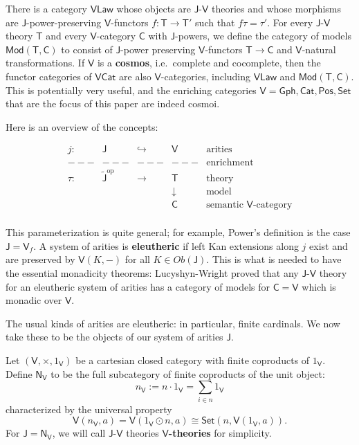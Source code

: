 \documentclass{amsart}
\theoremstyle{definition}
\newcommand{\Gph}{\mathsf{Gph}}
\newcommand{\Set}{\mathsf{Set}}
\newcommand{\Cat}{\mathsf{Cat}}
\newcommand{\Law}{\mathsf{Law}}
\newcommand{\Pos}{\mathsf{Pos}}
\newcommand{\Mod}{\mathsf{Mod}}
\newcommand{\NN}{\mathsf{N}}
\newcommand{\V}{\mathsf{V}}
\newcommand{\C}{\mathsf{C}}
\newcommand{\J}{\mathsf{J}}
\newcommand{\T}{\mathsf{T}}
\newcommand{\op}{\mathrm{op}}
\newcommand{\maps}{\colon}
\begin{document}
There is a category $\V\Law$ whose objects are $\J$-$\V$ theories and whose morphisms are $\J$-power-preserving $\V$-functors $f\maps \T \to \T'$ such that $f\tau = \tau'$. For every $\J$-$\V$ theory $\T$ and every $\V$-category $\C$ with $\J$-powers, we define the category of models $\Mod(\T,\C)$ to consist of $\J$-power preserving $\V$-functors $\T\to \C$ and $\V$-natural transformations. If  $\V$ is a \textbf{cosmos}, i.e.\ complete and cocomplete, then the functor categories of $\V\Cat$ are also $\V$-categories, including $\V\Law$ and $\Mod(\T,\C)$. This is potentially very useful, and the enriching categories $\V = \Gph, \Cat, \Pos, \Set$ that are the focus of this paper are indeed cosmoi.

Here is an overview of the concepts: 

\[\begin{array}{ccccl}
j\maps & \J & \hookrightarrow & \V & \text{arities}\\
---& --- & --- & --- & \text{enrichment}\\
\tau\maps & \tilde{\J}^\op & \to & \T & \text{theory}\\
& & & \downarrow & \text{model}\\
& & & \C & \text{semantic $\V$-category}\\
\end{array}\]

This parameterization is quite general; for example, Power's definition is the case $\J = \V_f$. A system of arities is \textbf{eleutheric} if left Kan extensions along $j$ exist and are preserved by $\V(K,-)$ for all $K \in Ob(\J)$. This is what is needed to have the essential monadicity theorems: Lucyshyn-Wright proved that any $\J$-$\V$ theory for an eleutheric system of arities has a category of models for $\C = \V$ which is monadic over $\V$. 

The usual kinds of arities are eleutheric: in particular, finite cardinals.  We now take these to be the objects of our system of arities $\J$.

Let $(\V,\times,1_\V)$ be a cartesian closed category with finite coproducts of $1_\V$. Define $\NN_\V$ to be the full subcategory of finite coproducts of the unit object:
\[   n_\V := n \cdot 1_\V = \sum_{i \in n} 1_\V  \]
characterized by the universal property
\begin{equation}
\V(n_\V,a) = \V(1_\V \odot n,a) \cong \Set(n,\V(1_\V,a)).
\end{equation}
For $\J = \NN_\V$, we will call $\J$-$\V$ theories \textbf{$\V$-theories} for simplicity.
\end{document}
